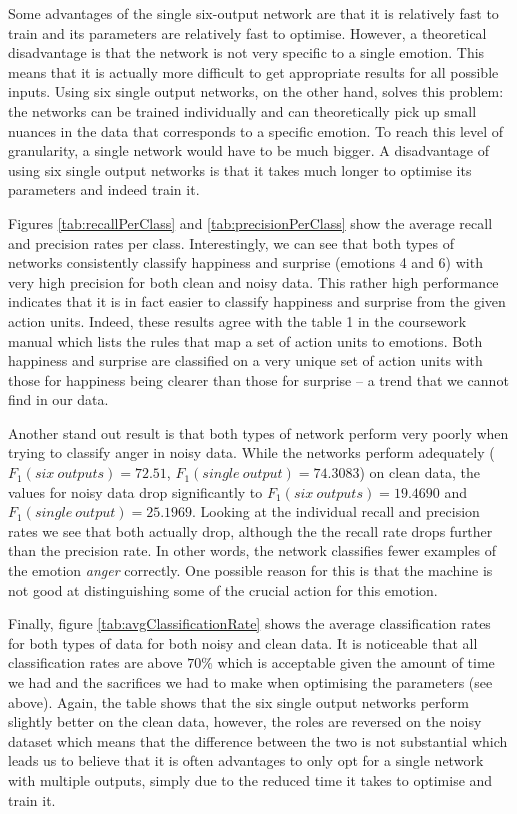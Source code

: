 \documentclass[10pt,a4paper]{article}
\begin{document}
Some advantages of the single six-output network are that it is relatively fast to train and its parameters are relatively fast to optimise. However, a theoretical disadvantage is that the network is not very specific to a single emotion. This means that it is actually more difficult to get appropriate results for all possible inputs. Using six single output networks, on the other hand, solves this problem: the networks can be trained individually and can theoretically pick up small nuances in the data that corresponds to a specific emotion. To reach this level of granularity, a single network would have to be much bigger. A disadvantage of using six single output networks is that it takes much longer to optimise its parameters and indeed train it.

Figures \ref{tab:recallPerClass}  and \ref{tab:precisionPerClass} show the average recall and precision rates per class. Interestingly, we can see that both types of networks consistently classify happiness and surprise (emotions 4 and 6) with very high precision for both clean and noisy data. This rather high performance indicates that it is in fact easier to classify happiness and surprise from the given action units. Indeed, these results agree with the table 1 in the coursework manual which lists the rules that map a set of action units to emotions. Both happiness and surprise are classified on a very unique set of action units with those for happiness being clearer than those for surprise -- a trend that we cannot find in our data.

Another stand out result is that both types of network perform very poorly when trying to classify anger in noisy data. While the networks perform adequately ($F_1(six~outputs) = 72.51$, $F_1(single~output) = 74.3083$) on clean data, the values for noisy data drop significantly to $F_1(six~outputs) = 19.4690$ and $F_1(single~output) = 25.1969$. Looking at the individual recall and precision rates we see that both actually drop, although the the recall rate drops further than the precision rate. In other words, the network classifies fewer examples of the emotion \emph{anger} correctly. One possible reason for this is that the machine is not good at distinguishing some of the crucial action for this emotion.

Finally, figure \ref{tab:avgClassificationRate} shows the average classification rates for both types of data for both noisy and clean data. It is noticeable that all classification rates are above $70\%$ which is acceptable given the amount of time we had and the sacrifices we had to make when optimising the parameters (see above). Again, the table shows that the six single output networks perform slightly better on the clean data, however, the roles are reversed on the noisy dataset which means that the difference between the two is not substantial which leads us to believe that it is often advantages to only opt for a single network with multiple outputs, simply due to the reduced time it takes to optimise and train it.
\end{document}
